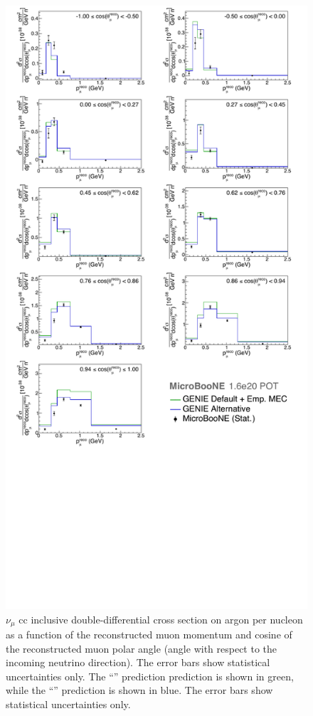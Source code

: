 \begin{figure}[]
\centering
\includegraphics[width=.85\textwidth]{images/XSecPmuCosThetaMu/xsec_bigger_stat}
\caption[$\nu_\mu$ CC Double-Differential Cross Section (Stat. Unc. Only, Split in $\cos\theta_\mu$ Bins)]{$\nu_\mu$ \acrshort{cc} inclusive double-differential cross section on argon per nucleon as a function of the reconstructed muon momentum and cosine of the reconstructed muon polar angle (angle with respect to the incoming neutrino direction). The error bars show statistical uncertainties only. The ``\tuneone'' prediction prediction is shown in green, while the ``\tunethree'' prediction is shown in blue. The error bars show statistical uncertainties only.}
\label{fig:trkcostheta_trkmumom__xsec_anglesplit_stat}
\end{figure}





